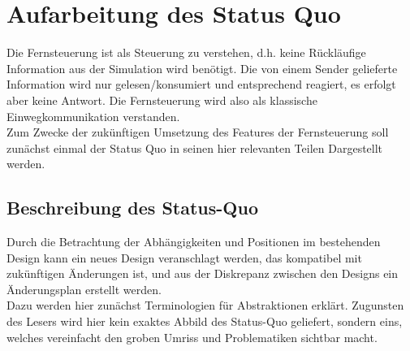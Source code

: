 \section{Aufarbeitung des Status Quo}
Die Fernsteuerung ist als Steuerung zu verstehen, d.h. keine Rückläufige Information aus der Simulation wird benötigt. Die von einem Sender gelieferte Information wird nur gelesen/konsumiert und entsprechend reagiert, es erfolgt aber keine Antwort. Die Fernsteuerung wird also als klassische Einwegkommunikation verstanden.\\

Zum Zwecke der zukünftigen Umsetzung des Features der Fernsteuerung soll zunächst einmal der Status Quo in seinen hier relevanten Teilen Dargestellt werden. 

\subsection{Beschreibung des Status-Quo}
Durch die Betrachtung der Abhängigkeiten und Positionen im bestehenden Design kann ein neues Design veranschlagt werden, das kompatibel mit zukünftigen Änderungen ist, und aus der Diskrepanz zwischen den Designs ein Änderungsplan erstellt werden.\\

Dazu werden hier zunächst Terminologien für Abstraktionen erklärt. Zugunsten des Lesers wird hier kein exaktes Abbild des Status-Quo geliefert, sondern eins, welches vereinfacht den groben Umriss und Problematiken sichtbar macht.



